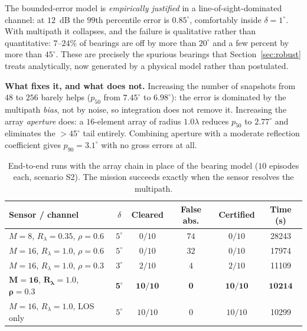 \documentclass[preprint,12pt,3p]{elsarticle}
\theoremstyle{definition}
\begin{document}
The bounded-error model is \emph{empirically justified} in a line-of-sight-dominated channel: at
$12$~dB the $99$th percentile error is $0.85^\circ$, comfortably inside $\delta=1^\circ$. With
multipath it collapses, and the failure is qualitative rather than quantitative: $7$--$24\%$ of
bearings are off by more than $20^\circ$ and a few percent by more than $45^\circ$. These are
precisely the spurious bearings that Section~\ref{sec:robust} treats analytically, now generated
by a physical model rather than postulated.

\noindent\textbf{What fixes it, and what does not.} Increasing the number of snapshots from $48$ to
$256$ barely helps ($p_{50}$ from $7.45^\circ$ to $6.98^\circ$): the error is dominated by the
multipath \emph{bias}, not by noise, so integration does not remove it. Increasing the array
\emph{aperture} does: a $16$-element array of radius $1.0\lambda$ reduces $p_{50}$ to
$2.77^\circ$ and eliminates the $>45^\circ$ tail entirely. Combining aperture with a moderate
reflection coefficient gives $p_{90}=3.1^\circ$ with no gross errors at all.

\begin{table}[t]
\caption{End-to-end runs with the array chain in place of the bearing model ($10$ episodes each,
scenario S2). The mission succeeds exactly when the sensor resolves the multipath.}
\label{tab:rfrun}
\centering
\small
\begin{tabular}{lccccc}
\toprule
Sensor / channel & $\delta$ & Cleared & \textbf{False abs.} & Certified & Time (s) \\
\midrule
$M{=}8$, $R_\lambda{=}0.35$, $\rho{=}0.6$ & $5^\circ$ & $0/10$ & $74$ & $0/10$ & 28243 \\
$M{=}16$, $R_\lambda{=}1.0$, $\rho{=}0.6$  & $5^\circ$ & $0/10$ & $32$ & $0/10$ & 17974 \\
$M{=}16$, $R_\lambda{=}1.0$, $\rho{=}0.3$  & $3^\circ$ & $2/10$ & $4$  & $2/10$ & 11109 \\
$\bm{M{=}16}$, $\bm{R_\lambda{=}1.0}$, $\bm{\rho{=}0.3}$ & $\bm{5^\circ}$ &
$\bm{10/10}$ & $\bm{0}$ & $\bm{10/10}$ & $\bm{10214}$ \\
$M{=}16$, $R_\lambda{=}1.0$, LOS only      & $5^\circ$ & $10/10$ & $0$ & $10/10$ & 10299 \\
\bottomrule
\end{tabular}
\end{table}
\end{document}
